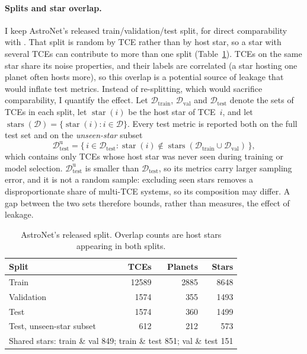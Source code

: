 \documentclass[11pt,a4paper]{article}
\begin{document}
\paragraph{Splits and star overlap.}
I keep AstroNet's released train/validation/test split, for direct comparability with
\cite{shallue2018}. That split is random by TCE rather than by host star, so a star
with several TCEs can contribute to more than one split
(Table~\ref{tab:splits}). TCEs on the same star share its noise properties, and their
labels are correlated (a star hosting one planet often hosts more), so this overlap
is a potential source of leakage that would inflate test metrics. Instead of
re-splitting, which would sacrifice comparability, I quantify the effect. Let $\mathcal{D}_{\text{train}}$, $\mathcal{D}_{\text{val}}$ and $\mathcal{D}_{\text{test}}$
denote the sets of TCEs in each split, let $\operatorname{star}(i)$ be the host star of
TCE~$i$, and let $\operatorname{stars}(\mathcal{D}) = \{\operatorname{star}(i) : i \in \mathcal{D}\}$.
Every test metric is reported both on the full test set and on the \emph{unseen-star} subset
\[
  \mathcal{D}_{\text{test}}^{\text{u}} = \{\, i \in \mathcal{D}_{\text{test}} :
  \operatorname{star}(i) \notin \operatorname{stars}(\mathcal{D}_{\text{train}} \cup \mathcal{D}_{\text{val}}) \,\},
\]
which contains only TCEs whose host star was never seen during training or model
selection. $\mathcal{D}_{\text{test}}^{\text{u}}$ is smaller than $\mathcal{D}_{\text{test}}$, so its
metrics carry larger sampling error, and it is not a random sample: excluding seen stars
removes a disproportionate share of multi-TCE systems, so its composition may differ.
A gap between the two sets therefore bounds, rather than measures, the effect of leakage.

\begin{table}[h]
  \centering
  \label{tab:splits}
  \begin{tabular}{lrrr}
    \toprule
    Split & TCEs & Planets & Stars \\
    \midrule
    Train                        & 12589  & 2885  & 8648 \\
    Validation                   & 1574 & 355  & 1493 \\
    Test                         & 1574  & 360  & 1499 \\
    Test, unseen-star subset     & 612  & 212  & 573  \\
    \midrule
    \multicolumn{4}{l}{Shared stars: train \& val 849; train \& test 851;
                       val \& test 151} \\
    \bottomrule
  \end{tabular}
  \caption{AstroNet's released split. Overlap counts are host stars appearing in both splits.}
\end{table}
\end{document}

